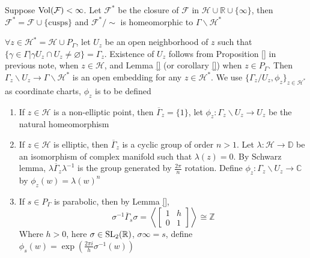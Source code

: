 \documentclass[main]{subfiles}
\begin{document}
\begin{remark}
Suppose $\operatorname{Vol}(\mathcal F)<\infty$. Let $\mathcal F^*$ be the closure of $\mathcal F$ in $\mathcal H\cup\mathbb R\cup\{\infty\}$, then $\mathcal F^*=\mathcal F\cup\{\text{cusps}\}$ and $\mathcal F^*/\sim$ is homeomorphic to $\Gamma\backslash\mathcal H^*$
\end{remark}

\begin{definition}
$\forall z\in\mathcal H^*=\mathcal H\cup P_\Gamma$, let $U_z$ be an open neighborhood of $z$ such that $\{\gamma\in\Gamma|\gamma U_z\cap U_z\neq\varnothing\}=\Gamma _z$. Existence of $U_z$ follows from Proposition \ref{} in previous note, when $z\in\mathcal H$, and Lemma \ref{} (or corollary \ref{}) when $z\in P_\Gamma$. Then $\Gamma_z\backslash U_z\to\Gamma\backslash\mathcal H^*$ is an open embedding for any $z\in\mathcal H^*$. We use $\{\Gamma_z/U_z,\phi_z\}_{z\in\mathcal H^*}$ as coordinate charts, $\phi_z$ is to be defined
\begin{enumerate}
\item If $z\in\mathcal H$ is a non-elliptic point, then $\overline\Gamma_z=\{1\}$, let $\phi_z:\Gamma_z\backslash U_z\to U_z$ be the natural homeomorphism
\item If $z\in\mathcal H$ is elliptic, then $\overline\Gamma_z$ is a cyclic group of order $n>1$. Let $\lambda:\mathcal H\to\mathbb D$ be an isomorphism of complex manifold such that $\lambda(z)=0$. By Schwarz lemma, $\lambda\overline\Gamma_z\lambda^{-1}$ is the group generated by $\frac{2\pi}{n}$ rotation. Define $\phi_z:\Gamma_z\backslash U_z\to\mathbb C$ by $\phi_z(w)=\lambda(w)^n$ \begin{center}
\end{center}
\item If $s\in P_\Gamma$ is parabolic, then by Lemma \ref{}, \[\sigma^{-1}\overline\Gamma_s\sigma=\left\langle\begin{bmatrix}
1&h \\
0&1
\end{bmatrix}\right\rangle\cong\mathbb Z\]Where $h>0$, here $\sigma\in\operatorname{SL}_2(\mathbb R)$, $\sigma\infty=s$, define $\phi_s(w)=\exp(\frac{2\pi i}{h}\sigma^{-1}(w))$ \begin{center}
\end{center}
\end{enumerate}
\end{definition}
\end{document}
